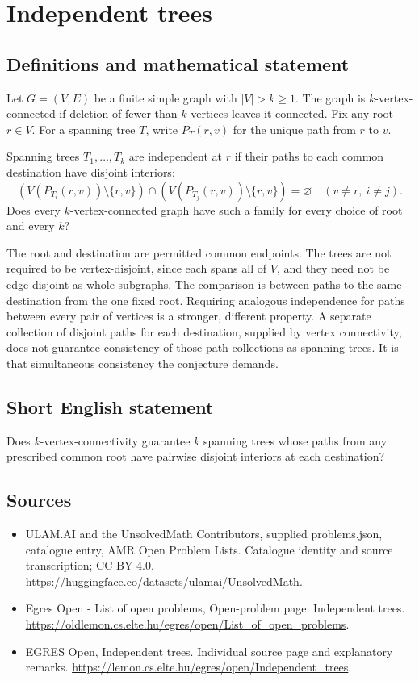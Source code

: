 \documentclass[11pt,a4paper]{article}
\begin{document}
\section*{Independent trees}\label{statement}

\subsection{Definitions and mathematical statement}
Let $G=(V,E)$ be a finite simple graph with $|V|>k\ge1$.
The graph is $k$-vertex-connected if deletion of fewer than $k$
vertices leaves it connected. Fix any root $r\in V$.
For a spanning tree $T$, write $P_T(r,v)$ for the unique path from
$r$ to $v$.

Spanning trees $T_1,\ldots,T_k$ are independent at $r$ if their paths
to each common destination have disjoint interiors:
\[
 (V(P_{T_i}(r,v))\setminus\{r,v\})\cap
 (V(P_{T_j}(r,v))\setminus\{r,v\})=\varnothing
                      \quad(v\ne r,\ i\ne j).
\]
Does every $k$-vertex-connected graph have such a family for every
choice of root and every $k$?

The root and destination are permitted common endpoints. The trees
are not required to be vertex-disjoint, since each spans all of $V$,
and they need not be edge-disjoint as whole subgraphs. The comparison
is between paths to the same destination from the one fixed root.
Requiring analogous independence for paths between every pair of
vertices is a stronger, different property. A separate collection
of disjoint paths for each destination, supplied by vertex connectivity,
does not guarantee consistency of those path collections as spanning
trees. It is that simultaneous consistency the conjecture demands.
\subsection{Short English statement}
Does $k$-vertex-connectivity guarantee $k$ spanning trees whose
paths from any prescribed common root have pairwise disjoint interiors at each destination?
\subsection{Sources}
\begin{itemize}
\item[S1] ULAM.AI and the UnsolvedMath Contributors, supplied problems.json, catalogue entry, AMR Open Problem Lists. Catalogue identity and source transcription; CC BY 4.0.
\url{https://huggingface.co/datasets/ulamai/UnsolvedMath}.
\item[S2] Egres Open - List of open problems, Open-problem page: Independent trees. 
\url{https://oldlemon.cs.elte.hu/egres/open/List_of_open_problems}.
\item[S3] EGRES Open, Independent trees. Individual source page and explanatory remarks.
\url{https://lemon.cs.elte.hu/egres/open/Independent_trees}.
\end{itemize}
\end{document}
